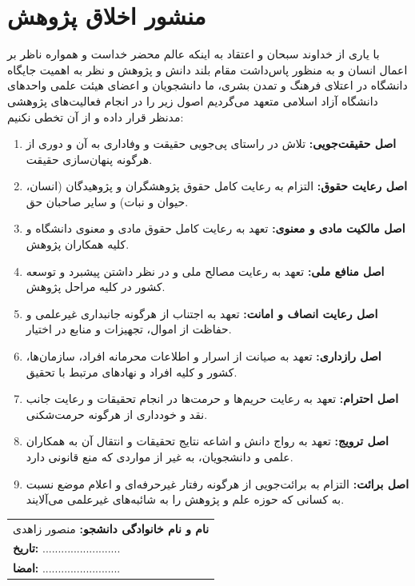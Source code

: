 \chapter*{منشور اخلاق پژوهش}

با یاری از خداوند سبحان و اعتقاد به اینکه عالم محضر خداست و همواره ناظر بر اعمال انسان و به منظور پاس‌داشت مقام بلند دانش و پژوهش و نظر به اهمیت جایگاه دانشگاه در اعتلای فرهنگ و تمدن بشری، ما دانشجویان و اعضای هیئت علمی واحدهای دانشگاه آزاد اسلامی متعهد می‌گردیم اصول زیر را در انجام فعالیت‌های پژوهشی مدنظر قرار داده و از آن تخطی نکنیم:

\begin{enumerate}
    \item \textbf{اصل حقیقت‌جویی:} تلاش در راستای پی‌جویی حقیقت و وفاداری به آن و دوری از هرگونه پنهان‌سازی حقیقت.
    \item \textbf{اصل رعایت حقوق:} التزام به رعایت کامل حقوق پژوهشگران و پژوهیدگان (انسان، حیوان و نبات) و سایر صاحبان حق.
    \item \textbf{اصل مالکیت مادی و معنوی:} تعهد به رعایت کامل حقوق مادی و معنوی دانشگاه و کلیه همکاران پژوهش.
    \item \textbf{اصل منافع ملی:} تعهد به رعایت مصالح ملی و در نظر داشتن پیشبرد و توسعه کشور در کلیه مراحل پژوهش.
    \item \textbf{اصل رعایت انصاف و امانت:} تعهد به اجتناب از هرگونه جانبداری غیرعلمی و حفاظت از اموال، تجهیزات و منابع در اختیار.
    \item \textbf{اصل رازداری:} تعهد به صیانت از اسرار و اطلاعات محرمانه افراد، سازمان‌ها، کشور و کلیه افراد و نهادهای مرتبط با تحقیق.
    \item \textbf{اصل احترام:} تعهد به رعایت حریم‌ها و حرمت‌ها در انجام تحقیقات و رعایت جانب نقد و خودداری از هرگونه حرمت‌شکنی.
    \item \textbf{اصل ترویج:} تعهد به رواج دانش و اشاعه نتایج تحقیقات و انتقال آن به همکاران علمی و دانشجویان، به غیر از مواردی که منع قانونی دارد.
    \item \textbf{اصل برائت:} التزام به برائت‌جویی از هرگونه رفتار غیرحرفه‌ای و اعلام موضع نسبت به کسانی که حوزه علم و پژوهش را به شائبه‌های غیرعلمی می‌آلایند.
\end{enumerate}

\vspace{1cm}

\begin{flushleft}
\begin{tabular}{l}
\textbf{نام و نام خانوادگی دانشجو:} منصور زاهدی \\
\textbf{تاریخ:} ......................... \\
\textbf{امضا:} ......................... \\
\end{tabular}
\end{flushleft}

\newpage
